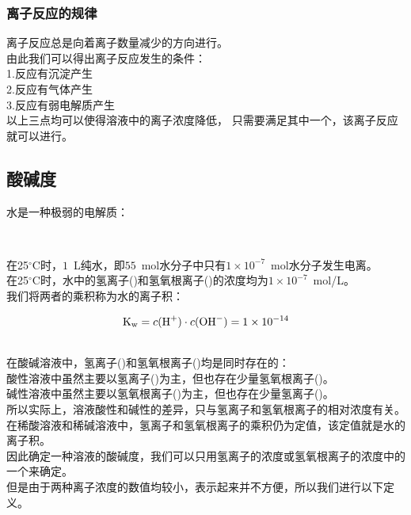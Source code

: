 \documentclass[UTF8]{ctexart}
\begin{document}
\newpage

\subsubsection{离子反应的规律}
    离子反应总是向着离子数量减少的方向进行。\\[3mm]
    由此我们可以得出离子反应发生的条件：\\[3mm]
    1.反应有沉淀产生\\[3mm]
    2.反应有气体产生\\[3mm]
    3.反应有弱电解质产生\\[5mm]
    以上三点均可以使得溶液中的离子浓度降低，
    只需要满足其中一个，该离子反应就可以进行。\\

\subsection{酸碱度}
    水是一种极弱的电解质：
    \begin{center}
        \\[3mm]
    \end{center}
    在25$^\circ$C时，$1$~L纯水，即$55$~mol水分子中只有$1\times10^{-7}$~mol水分子发生电离。\\[3mm]
    在25$^\circ$C时，水中的氢离子()和氢氧根离子()的浓度均为$1\times10^{-7}$~mol/L。\\[3mm]
    我们将两者的乘积称为水的离子积：
    \begin{large}
        \begin{equation*}
            \text{K}_\text{w}=c(\ce{H+})\cdot c(\ce{OH-})=1\times 10^{-14}
        \end{equation*}
    \end{large}\\
    在酸碱溶液中，氢离子()和氢氧根离子()均是同时存在的：\\[3mm]
    酸性溶液中虽然主要以氢离子()为主，但也存在少量氢氧根离子()。\\[3mm]
    碱性溶液中虽然主要以氢氧根离子()为主，但也存在少量氢离子()。\\[6mm]
    所以实际上，溶液酸性和碱性的差异，只与氢离子和氢氧根离子的相对浓度有关。\\[3mm]
    在稀酸溶液和稀碱溶液中，氢离子和氢氧根离子的乘积仍为定值，该定值就是水的离子积。\\[6mm]
    因此确定一种溶液的酸碱度，我们可以只用氢离子的浓度或氢氧根离子的浓度中的一个来确定。\\[3mm]
    但是由于两种离子浓度的数值均较小，表示起来并不方便，所以我们进行以下定义。
\end{document}
